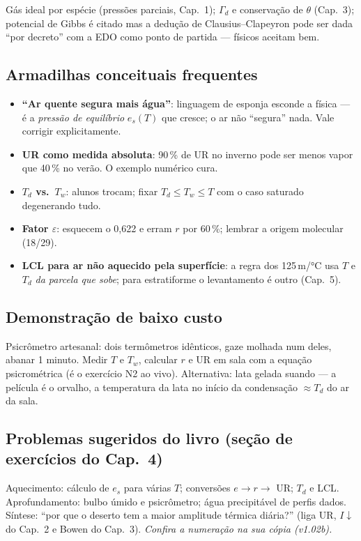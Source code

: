 Gás ideal por espécie (pressões parciais, Cap.~1); $\Gamma_d$ e conservação
de $\theta$ (Cap.~3); potencial de Gibbs é citado mas a dedução de
Clausius--Clapeyron pode ser dada ``por decreto'' com a EDO como ponto de
partida — físicos aceitam bem.

\subsection*{Armadilhas conceituais frequentes}

\begin{itemize}
  \item \textbf{``Ar quente segura mais água''}: linguagem de esponja
        esconde a física — é a \emph{pressão de equilíbrio} $e_s(T)$ que
        cresce; o ar não ``segura'' nada. Vale corrigir explicitamente.
  \item \textbf{UR como medida absoluta}: 90\,\% de UR no inverno pode ser
        menos vapor que 40\,\% no verão. O exemplo numérico cura.
  \item \textbf{$T_d$ vs.\ $T_w$}: alunos trocam; fixar
        $T_d \le T_w \le T$ com o caso saturado degenerando tudo.
  \item \textbf{Fator $\varepsilon$}: esquecem o 0,622 e erram $r$ por
        60\,\%; lembrar a origem molecular (18/29).
  \item \textbf{LCL para ar não aquecido pela superfície}: a regra dos
        125\,m/°C usa $T$ e $T_d$ \emph{da parcela que sobe}; para
        estratiforme o levantamento é outro (Cap.~5).
\end{itemize}

\subsection*{Demonstração de baixo custo}

Psicrômetro artesanal: dois termômetros idênticos, gaze molhada num deles,
abanar 1 minuto. Medir $T$ e $T_w$, calcular $r$ e UR em sala com a equação
psicrométrica (é o exercício N2 ao vivo). Alternativa: lata gelada suando —
a película é o orvalho, a temperatura da lata no início da condensação
$\approx T_d$ do ar da sala.

\subsection*{Problemas sugeridos do livro (seção de exercícios do Cap.~4)}

Aquecimento: cálculo de $e_s$ para várias $T$; conversões $e \to r \to$ UR;
$T_d$ e LCL. Aprofundamento: bulbo úmido e psicrômetro; água precipitável
de perfis dados. Síntese: ``por que o deserto tem a maior amplitude térmica
diária?'' (liga UR, $I\!\downarrow$ do Cap.~2 e Bowen do Cap.~3).
\emph{Confira a numeração na sua cópia (v1.02b).}

